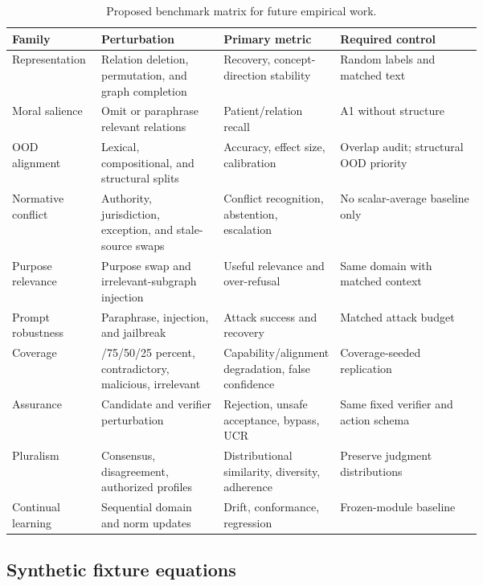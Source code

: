 \begin{table}[h]
\centering
\scriptsize
\caption{Proposed benchmark matrix for future empirical work.}
\label{tab:benchmarks}
\begin{tabularx}{\linewidth}{@{}>{\raggedright\arraybackslash}p{0.19\linewidth}>{\raggedright\arraybackslash}p{0.26\linewidth}>{\raggedright\arraybackslash}p{0.23\linewidth}>{\raggedright\arraybackslash}X@{}}
\toprule
Family & Perturbation & Primary metric & Required control \\
\midrule
Representation & Relation deletion, permutation, and graph completion & Recovery, concept-direction stability & Random labels and matched text \\
Moral salience & Omit or paraphrase relevant relations & Patient/relation recall & A1 without structure \\
OOD alignment & Lexical, compositional, and structural splits & Accuracy, effect size, calibration & Overlap audit; structural OOD priority \\
Normative conflict & Authority, jurisdiction, exception, and stale-source swaps & Conflict recognition, abstention, escalation & No scalar-average baseline only \\
Purpose relevance & Purpose swap and irrelevant-subgraph injection & Useful relevance and over-refusal & Same domain with matched context \\
Prompt robustness & Paraphrase, injection, and jailbreak & Attack success and recovery & Matched attack budget \\
Coverage & 100/75/50/25 percent, contradictory, malicious, irrelevant & Capability/alignment degradation, false confidence & Coverage-seeded replication \\
Assurance & Candidate and verifier perturbation & Rejection, unsafe acceptance, bypass, UCR & Same fixed verifier and action schema \\
Pluralism & Consensus, disagreement, authorized profiles & Distributional similarity, diversity, adherence & Preserve judgment distributions \\
Continual learning & Sequential domain and norm updates & Drift, conformance, regression & Frozen-module baseline \\
\bottomrule
\end{tabularx}
\end{table}

\subsection{Synthetic fixture equations}

